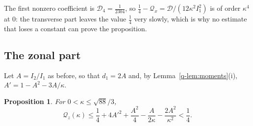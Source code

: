 \documentclass[11pt]{amsart}
\newtheorem{proposition}[theorem]{Proposition}
\theoremstyle{definition}
\theoremstyle{remark}
\numberwithin{equation}{section}
\begin{document}
The first nonzero coefficient is $\mathcal D_4=\frac1{2304}$, so
$\frac14-\mathcal Q_x=\mathcal D/(12\kappa^2I_1^2)$ is of order $\kappa^4$ at $0$: the transverse part
leaves the value $\frac14$ very slowly, which is why no estimate that loses a
constant can prove the proposition.

\subsection{The zonal part}

Let $A=I_2/I_1$ as before, so that $d_1=2A$ and, by
Lemma~\ref{q-lem:moments}(i), $A'=1-A^2-3A/\kappa$.

\begin{proposition}\label{q-prop:zonal}
For $0<\kappa\le\sqrt{88}/3$,
\[
\mathcal Q_z(\kappa)\le\frac14+4A'^2+\frac{A^2}4-\frac A{2\kappa}-
\frac{2A^2}{\kappa^2}<\frac14 .
\]
\end{proposition}
\end{document}

